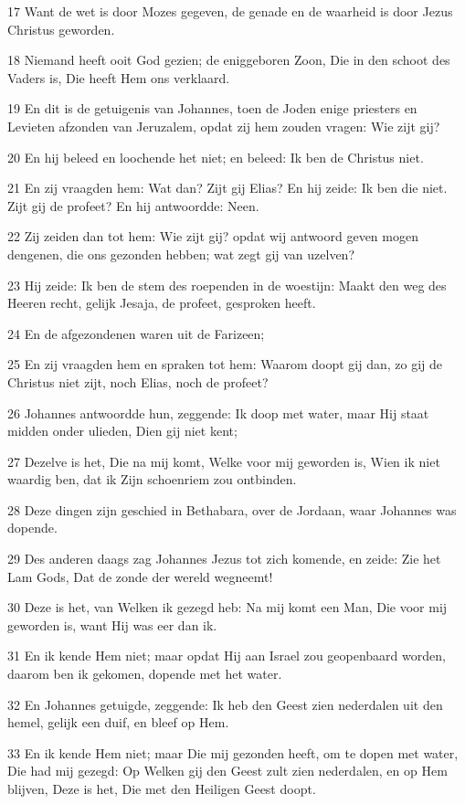 \par 17 Want de wet is door Mozes gegeven, de genade en de waarheid is door Jezus Christus geworden.
\par 18 Niemand heeft ooit God gezien; de eniggeboren Zoon, Die in den schoot des Vaders is, Die heeft Hem ons verklaard.
\par 19 En dit is de getuigenis van Johannes, toen de Joden enige priesters en Levieten afzonden van Jeruzalem, opdat zij hem zouden vragen: Wie zijt gij?
\par 20 En hij beleed en loochende het niet; en beleed: Ik ben de Christus niet.
\par 21 En zij vraagden hem: Wat dan? Zijt gij Elias? En hij zeide: Ik ben die niet. Zijt gij de profeet? En hij antwoordde: Neen.
\par 22 Zij zeiden dan tot hem: Wie zijt gij? opdat wij antwoord geven mogen dengenen, die ons gezonden hebben; wat zegt gij van uzelven?
\par 23 Hij zeide: Ik ben de stem des roependen in de woestijn: Maakt den weg des Heeren recht, gelijk Jesaja, de profeet, gesproken heeft.
\par 24 En de afgezondenen waren uit de Farizeen;
\par 25 En zij vraagden hem en spraken tot hem: Waarom doopt gij dan, zo gij de Christus niet zijt, noch Elias, noch de profeet?
\par 26 Johannes antwoordde hun, zeggende: Ik doop met water, maar Hij staat midden onder ulieden, Dien gij niet kent;
\par 27 Dezelve is het, Die na mij komt, Welke voor mij geworden is, Wien ik niet waardig ben, dat ik Zijn schoenriem zou ontbinden.
\par 28 Deze dingen zijn geschied in Bethabara, over de Jordaan, waar Johannes was dopende.
\par 29 Des anderen daags zag Johannes Jezus tot zich komende, en zeide: Zie het Lam Gods, Dat de zonde der wereld wegneemt!
\par 30 Deze is het, van Welken ik gezegd heb: Na mij komt een Man, Die voor mij geworden is, want Hij was eer dan ik.
\par 31 En ik kende Hem niet; maar opdat Hij aan Israel zou geopenbaard worden, daarom ben ik gekomen, dopende met het water.
\par 32 En Johannes getuigde, zeggende: Ik heb den Geest zien nederdalen uit den hemel, gelijk een duif, en bleef op Hem.
\par 33 En ik kende Hem niet; maar Die mij gezonden heeft, om te dopen met water, Die had mij gezegd: Op Welken gij den Geest zult zien nederdalen, en op Hem blijven, Deze is het, Die met den Heiligen Geest doopt.
